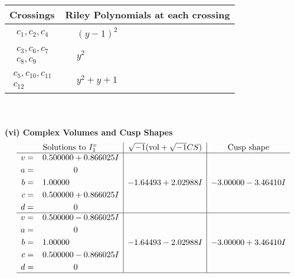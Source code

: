 \documentclass[1p]{elsarticle_modified}
\theoremstyle{definition}
\newcommand{\I}{\sqrt{-1}}
\begin{document}
\begin{tabular}{m{50pt}|m{274pt}}
Crossings & \hspace{64pt}Riley Polynomials at each crossing \\
\hline $$\begin{aligned}c_{1},c_{2},c_{4}\end{aligned}$$&$\begin{aligned}
&(y-1)^2
\end{aligned}$\\
\hline $$\begin{aligned}c_{3},c_{6},c_{7}\\c_{8},c_{9}\end{aligned}$$&$\begin{aligned}
&y^2
\end{aligned}$\\
\hline $$\begin{aligned}c_{5},c_{10},c_{11}\\c_{12}\end{aligned}$$&$\begin{aligned}
&y^2+y+1
\end{aligned}$\\
\hline
\end{tabular}\\~\\
\newpage\flushleft \textbf{(vi) Complex Volumes and Cusp Shapes}
$$\begin{array}{c|c|c}  
\text{Solutions to }I^v_{1}& \I (\text{vol} + \sqrt{-1}CS) & \text{Cusp shape}\\
 \hline 
\begin{aligned}
v &= \phantom{-}0.500000 + 0.866025 I \\
a &= \phantom{-0.000000 } 0 \\
b &= \phantom{-}1.00000\phantom{ +0.000000I} \\
c &= \phantom{-}0.500000 + 0.866025 I \\
d &= \phantom{-0.000000 } 0\end{aligned}
 & -1.64493 + 2.02988 I & -3.00000 - 3.46410 I \\ \hline\begin{aligned}
v &= \phantom{-}0.500000 - 0.866025 I \\
a &= \phantom{-0.000000 } 0 \\
b &= \phantom{-}1.00000\phantom{ +0.000000I} \\
c &= \phantom{-}0.500000 - 0.866025 I \\
d &= \phantom{-0.000000 } 0\end{aligned}
 & -1.64493 - 2.02988 I & -3.00000 + 3.46410 I\\
 \hline 
 \end{array}$$\newpage\newpage\renewcommand{\arraystretch}{1}
\end{document}
